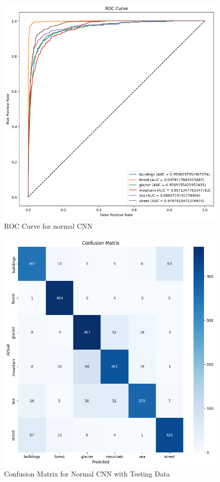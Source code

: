 \documentclass[conference]{IEEEtran}
\begin{document}
\begin{figure}[H]
    \centering
    \includegraphics[width=1\linewidth]{images//CNN/ROCCurve_CnnNormal.png}
    \caption{ROC Curve for normal CNN}
    \label{fig:ROC_CNN_Normal}
\end{figure}


\begin{figure}[H]
    \centering
    \includegraphics[width=1\linewidth]{images//CNN/ConfusionMatrixCNNNormal.png}
    \caption{Confusion Matrix for Normal CNN with Testing Data}
    \label{fig:CM_CNN_Normal}
\end{figure}
\end{document}
